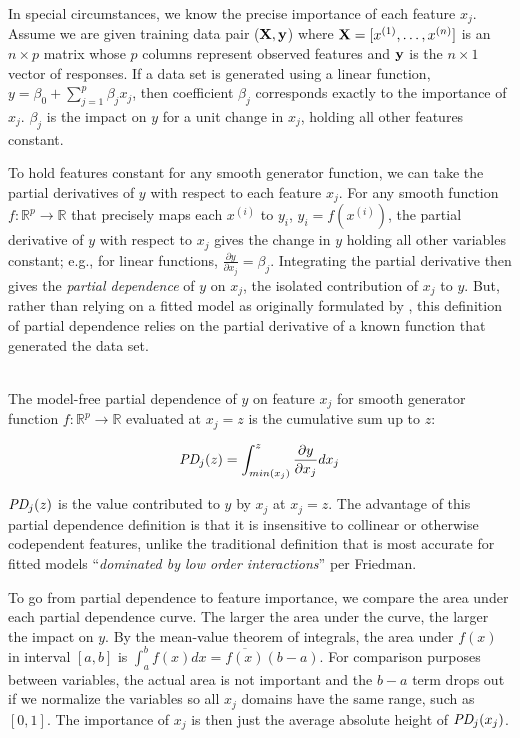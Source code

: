 \documentclass[12pt]{article}
\newcommand{\todo}[1]{{{\color{red}{[#1]}}}}
\renewcommand{\xi}{x^{(i)}}
\begin{document}
In special circumstances, we know the precise importance of each feature $x_j$. Assume we are given training data pair ($\bf X, y$) where ${\bf X} = [x^{(1)}, \ldots, x^{(n)}]$ is an $n \times p$ matrix whose $p$ columns represent observed features and ${\bf y}$ is the $n \times 1$ vector of responses.  If a data set is generated using a linear function, $y = \beta_0 + \sum_{j=1}^p \beta_j x_j$, \todo{assumes independence of $x_j$?} then coefficient $\beta_j$ corresponds exactly to the importance of $x_j$.  $\beta_j$ is the impact on $y$ for a unit change in $x_j$, holding all other features constant.

To hold features constant for any smooth generator function, we can take the partial derivatives of $y$ with respect to each feature $x_j$. For any smooth function $f:\mathbb{R}^{p} \rightarrow \mathbb{R}$ that precisely maps each $\xi$ to $y_i$, ${y_i} = f(\xi)$, \todo{should that be $y^{(i)}$ to be consistent?} the partial derivative of $y$ with respect to $x_j$ gives the change in $y$ holding all other variables constant; e.g., for linear functions, $\frac{\partial y}{\partial x_j}=\beta_j$. Integrating the partial derivative then gives the {\em partial dependence}  of $y$ on $x_j$, the isolated contribution of $x_j$ to $y$. But, rather than relying on a fitted model as originally formulated by \cite{PDP}, this definition of partial dependence relies on the partial derivative of a known function that generated the data set.

~\\
 The model-free partial dependence of $y$ on feature $x_j$ for smooth generator function $f:\mathbb{R}^{p} \rightarrow \mathbb{R}$ evaluated at $x_j = z$ is the cumulative sum up to $z$:

\begin{equation}\label{eq:pd}
\text{\it PD}_j(z) = \int_{min(x_j)}^z \frac{\partial y}{\partial x_j} dx_j
\end{equation}

$\text{\it PD}_j(z)$ is the value contributed to $y$ by $x_j$ at $x_j = z$. The advantage of this partial dependence definition is that it is insensitive to collinear or otherwise codependent features, unlike the traditional definition that is most accurate for fitted models ``{\em dominated by low order interactions}'' per Friedman.  

To go from partial dependence to feature importance, we compare the area under each partial dependence curve. The larger the area under the curve, the larger the impact on $y$.   By the mean-value theorem of integrals, the area under $f(x)$ in interval $[a,b]$ is $\int_{a}^{b} f(x) dx = \overline{f(x)}(b-a)$.  For comparison purposes between variables, the actual area is not important and the $b-a$ term drops out if we normalize the variables so all $x_j$ domains have the same range, such as $[0,1]$. The importance of $x_j$ is then just the average absolute height of $\text{\it PD}_j(x_j)$.
\end{document}
